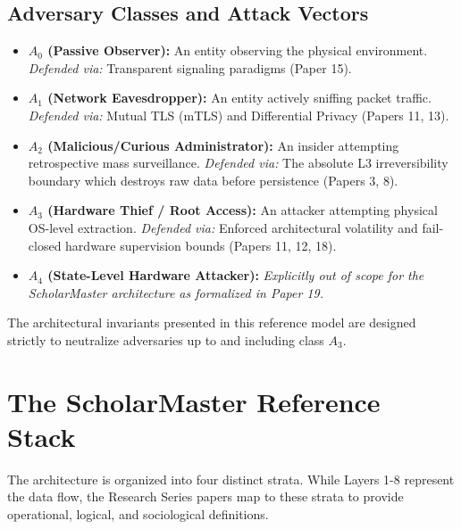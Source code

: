 \documentclass[conference]{IEEEtran}
\begin{document}
\subsection{Adversary Classes and Attack Vectors}
\begin{itemize}
    \item \textbf{$A_0$ (Passive Observer):} An entity observing the physical environment. \textit{Defended via:} Transparent signaling paradigms (Paper 15).
    \item \textbf{$A_1$ (Network Eavesdropper):} An entity actively sniffing packet traffic. \textit{Defended via:} Mutual TLS (mTLS) and Differential Privacy (Papers 11, 13).
    \item \textbf{$A_2$ (Malicious/Curious Administrator):} An insider attempting retrospective mass surveillance. \textit{Defended via:} The absolute L3 irreversibility boundary which destroys raw data before persistence (Papers 3, 8).
    \item \textbf{$A_3$ (Hardware Thief / Root Access):} An attacker attempting physical OS-level extraction. \textit{Defended via:} Enforced architectural volatility and fail-closed hardware supervision bounds (Papers 11, 12, 18).
    \item \textbf{$A_4$ (State-Level Hardware Attacker):} \textit{Explicitly out of scope for the ScholarMaster architecture as formalized in Paper 19.}
\end{itemize}

The architectural invariants presented in this reference model are designed strictly to neutralize adversaries up to and including class $A_3$.

\section{The ScholarMaster Reference Stack}

The architecture is organized into four distinct strata. While Layers 1-8 represent the data flow, the Research Series papers map to these strata to provide operational, logical, and sociological definitions.
\end{document}
